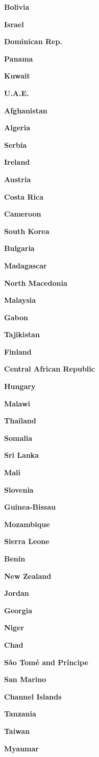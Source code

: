 \textbf{Bolivia}

\textbf{Israel}

\textbf{Dominican Rep.}

\textbf{Panama}

\textbf{Kuwait}

\textbf{U.A.E.}

\textbf{Afghanistan}

\textbf{Algeria}

\textbf{Serbia}

\textbf{Ireland}

\textbf{Austria}

\textbf{Costa Rica}

\textbf{Cameroon}

\textbf{South Korea}

\textbf{Bulgaria}

\textbf{Madagascar}

\textbf{North Macedonia}

\textbf{Malaysia}

\textbf{Gabon}

\textbf{Tajikistan}

\textbf{Finland}

\textbf{Central African Republic}

\textbf{Hungary}

\textbf{Malawi}

\textbf{Thailand}

\textbf{Somalia}

\textbf{Sri Lanka}

\textbf{Mali}

\textbf{Slovenia}

\textbf{Guinea-Bissau}

\textbf{Mozambique}

\textbf{Sierra Leone}

\textbf{Benin}

\textbf{New Zealand}

\textbf{Jordan}

\textbf{Georgia}

\textbf{Niger}

\textbf{Chad}

\textbf{São Tomé and Príncipe}

\textbf{San Marino}

\textbf{Channel Islands}

\textbf{Tanzania}

\textbf{Taiwan}

\textbf{Myanmar}

